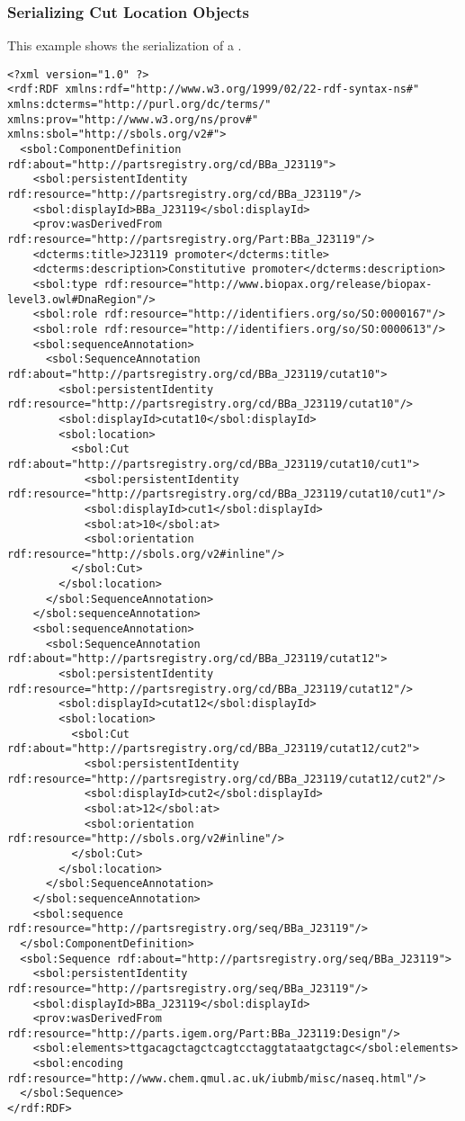 \subsubsection{Serializing Cut Location Objects}
This example shows the serialization of a  .
\begin{lstlisting}
<?xml version="1.0" ?>
<rdf:RDF xmlns:rdf="http://www.w3.org/1999/02/22-rdf-syntax-ns#" xmlns:dcterms="http://purl.org/dc/terms/" xmlns:prov="http://www.w3.org/ns/prov#" xmlns:sbol="http://sbols.org/v2#">
  <sbol:ComponentDefinition rdf:about="http://partsregistry.org/cd/BBa_J23119">
    <sbol:persistentIdentity rdf:resource="http://partsregistry.org/cd/BBa_J23119"/>
    <sbol:displayId>BBa_J23119</sbol:displayId>
    <prov:wasDerivedFrom rdf:resource="http://partsregistry.org/Part:BBa_J23119"/>
    <dcterms:title>J23119 promoter</dcterms:title>
    <dcterms:description>Constitutive promoter</dcterms:description>
    <sbol:type rdf:resource="http://www.biopax.org/release/biopax-level3.owl#DnaRegion"/>
    <sbol:role rdf:resource="http://identifiers.org/so/SO:0000167"/>
    <sbol:role rdf:resource="http://identifiers.org/so/SO:0000613"/>
    <sbol:sequenceAnnotation>
      <sbol:SequenceAnnotation rdf:about="http://partsregistry.org/cd/BBa_J23119/cutat10">
        <sbol:persistentIdentity rdf:resource="http://partsregistry.org/cd/BBa_J23119/cutat10"/>
        <sbol:displayId>cutat10</sbol:displayId>
        <sbol:location>
          <sbol:Cut rdf:about="http://partsregistry.org/cd/BBa_J23119/cutat10/cut1">
            <sbol:persistentIdentity rdf:resource="http://partsregistry.org/cd/BBa_J23119/cutat10/cut1"/>
            <sbol:displayId>cut1</sbol:displayId>
            <sbol:at>10</sbol:at>
            <sbol:orientation rdf:resource="http://sbols.org/v2#inline"/>
          </sbol:Cut>
        </sbol:location>
      </sbol:SequenceAnnotation>
    </sbol:sequenceAnnotation>
    <sbol:sequenceAnnotation>
      <sbol:SequenceAnnotation rdf:about="http://partsregistry.org/cd/BBa_J23119/cutat12">
        <sbol:persistentIdentity rdf:resource="http://partsregistry.org/cd/BBa_J23119/cutat12"/>
        <sbol:displayId>cutat12</sbol:displayId>
        <sbol:location>
          <sbol:Cut rdf:about="http://partsregistry.org/cd/BBa_J23119/cutat12/cut2">
            <sbol:persistentIdentity rdf:resource="http://partsregistry.org/cd/BBa_J23119/cutat12/cut2"/>
            <sbol:displayId>cut2</sbol:displayId>
            <sbol:at>12</sbol:at>
            <sbol:orientation rdf:resource="http://sbols.org/v2#inline"/>
          </sbol:Cut>
        </sbol:location>
      </sbol:SequenceAnnotation>
    </sbol:sequenceAnnotation>
    <sbol:sequence rdf:resource="http://partsregistry.org/seq/BBa_J23119"/>
  </sbol:ComponentDefinition>
  <sbol:Sequence rdf:about="http://partsregistry.org/seq/BBa_J23119">
    <sbol:persistentIdentity rdf:resource="http://partsregistry.org/seq/BBa_J23119"/>
    <sbol:displayId>BBa_J23119</sbol:displayId>
    <prov:wasDerivedFrom rdf:resource="http://parts.igem.org/Part:BBa_J23119:Design"/>
    <sbol:elements>ttgacagctagctcagtcctaggtataatgctagc</sbol:elements>
    <sbol:encoding rdf:resource="http://www.chem.qmul.ac.uk/iubmb/misc/naseq.html"/>
  </sbol:Sequence>
</rdf:RDF>
\end{lstlisting}


